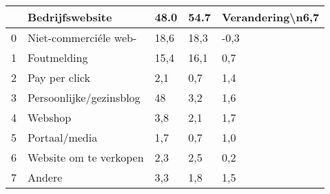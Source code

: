 \begin{tabular}{lllll}
\toprule
{} &          Bedrijfswebsite &  48.0 &  54.7 & Verandering\textbackslash n6,7 \\
\midrule
0 &    Niet-commerciéle web- &  18,6 &  18,3 &             -0,3 \\
1 &              Foutmelding &  15,4 &  16,1 &              0,7 \\
2 &            Pay per click &   2,1 &   0,7 &              1,4 \\
3 &  Persoonlijke/gezinsblog &    48 &   3,2 &              1,6 \\
4 &                  Webshop &   3,8 &   2,1 &              1,7 \\
5 &            Portaal/media &   1,7 &   0,7 &              1,0 \\
6 &   Website om te verkopen &   2,3 &   2,5 &              0,2 \\
7 &                   Andere &   3,3 &   1,8 &              1,5 \\
\bottomrule
\end{tabular}
